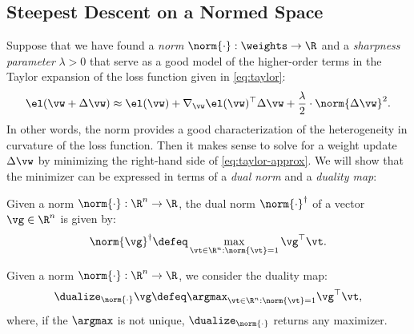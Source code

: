 \subsection{Steepest Descent on a Normed Space}\label{sec:steepest-descent-prelim}

Suppose that we have found a \textit{norm} $\norm{\cdot}:\weights\to\R$ and a \textit{sharpness parameter} $\lambda >0$ that serve as a good model of the higher-order terms in the Taylor expansion of the loss function given in \cref{eq:taylor}:
\begin{equation}\label{eq:taylor-approx}
    \el(\vw+\Delta\vw) \approx \el(\vw) + \nabla_\vw \el(\vw)^\top\Delta\vw + \frac{\lambda}{2}\cdot \norm{\Delta \vw}^2.
\end{equation}In other words, the norm provides a good characterization of the heterogeneity in curvature of the loss function. Then it makes sense to solve for a weight update $\Delta \vw$ by minimizing the right-hand side of \cref{eq:taylor-approx}. We will show that the minimizer can be expressed in terms of a \textit{dual norm} and a \textit{duality map}:

\begin{mydefinition} Given a norm $\norm{\cdot}:\R^n\to\R$, the dual norm $\norm{\cdot}^\dagger$ of a vector $\vg \in \R^n$ is given by:
\begin{equation}
\norm{\vg}^\dagger\defeq\max_{\vt\in\R^n:\norm{\vt}=1} \vg^\top \vt.
\end{equation}
\end{mydefinition}

\begin{mydefinition} Given a norm $\norm{\cdot}:\R^n\to\R$, we consider the duality map:
\begin{equation}
\dualize_{\norm{\cdot}} \vg \defeq \argmax_{\vt\in\R^n:\norm{\vt}=1} \vg^\top \vt,
\end{equation}
where, if the $\argmax$ is not unique, $\dualize_{\norm{\cdot}}$ returns any maximizer.    
\end{mydefinition}

